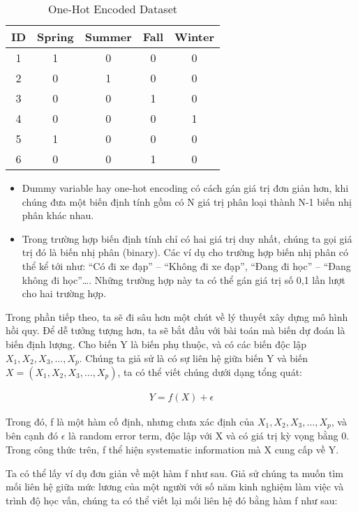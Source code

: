 \documentclass[
]{article}
\providecommand{\tightlist}{%
  \setlength{\itemsep}{0pt}\setlength{\parskip}{0pt}}
\begin{document}
\begin{table}
\centering
\caption{\label{tab:unnamed-chunk-4}One-Hot Encoded Dataset}
\centering
\begin{tabular}[t]{c|c|c|c|c}
\hline
ID & Spring & Summer & Fall & Winter\\
\hline
1 & 1 & 0 & 0 & 0\\
\hline
2 & 0 & 1 & 0 & 0\\
\hline
3 & 0 & 0 & 1 & 0\\
\hline
4 & 0 & 0 & 0 & 1\\
\hline
5 & 1 & 0 & 0 & 0\\
\hline
6 & 0 & 0 & 1 & 0\\
\hline
\end{tabular}
\end{table}

\begin{itemize}
\tightlist
\item
  Dummy variable hay one-hot encoding có cách gán giá trị đơn giản hơn, khi chúng đưa một biến định tính gồm có N giá trị phân loại thành N-1 biến nhị phân khác nhau.
\item
  Trong trường hợp biến định tính chỉ có hai giá trị duy nhất, chúng ta gọi giá trị đó là biến nhị phân (binary). Các ví dụ cho trường hợp biến nhị phân có thể kể tới như: ``Có đi xe đạp'' -- ``Không đi xe đạp'', ``Đang đi học'' -- ``Đang không đi học''\ldots. Những trường hợp này ta có thể gán giá trị số 0,1 lần lượt cho hai trường hợp.
\end{itemize}

Trong phần tiếp theo, ta sẽ đi sâu hơn một chút về lý thuyết xây dựng mô hình hồi quy. Để dễ tưởng tượng hơn, ta sẽ bắt đầu với bài toán mà biến dự đoán là biến định lượng. Cho biến Y là biến phụ thuộc, và có các biến độc lập \(X_1,X_2,X_3,…,X_p\). Chúng ta giả sử là có sự liên hệ giữa biến Y và biến \(X = (X_1,X_2,X_3,…,X_p)\), ta có thể viết chúng dưới dạng tổng quát:

\begin{align}
Y = f(X) + \epsilon
\end{align}

Trong đó, f là một hàm cố định, nhưng chưa xác định của \(X_1,X_2,X_3,…,X_p\), và bên cạnh đó \(\epsilon\) là random error term, độc lập với X và có giá trị kỳ vọng bằng 0. Trong công thức trên, f thể hiện systematic information mà X cung cấp về Y.

Ta có thể lấy ví dụ đơn giản về một hàm f như sau. Giả sử chúng ta muốn tìm mối liên hệ giữa mức lương của một người với số năm kinh nghiệm làm việc và trình độ học vấn, chúng ta có thể viết lại mối liên hệ đó bằng hàm f như sau:
\end{document}
